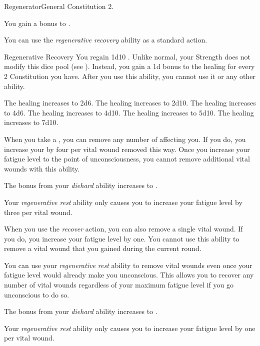     \begin{feat}{Regenerator}{General}
        \featpre Constitution 2.

         You gain a  bonus to .

         You can use the \textit{regenerative recovery} ability as a standard action.
        \begin{instantability}{Regenerative Recovery}
            \rankline
            You regain 1d10 \add {} .
            Unlike normal, your Strength does not modify this dice pool (see ).
            Instead, you gain a \plus1d bonus to the healing for every 2 Constitution you have.
            After you use this ability, you  cannot use it or any other  ability.

            \rankline
             The healing increases to 2d6.
             The healing increases to 2d10.
             The healing increases to 4d6.
             The healing increases to 4d10.
             The healing increases to 5d10.
             The healing increases to 7d10.
        \end{instantability}

         When you take a , you can remove any number of  affecting you.
        If you do, you increase your  by four per vital wound removed this way.
        Once you increase your fatigue level to the point of unconsciousness, you cannot remove additional vital wounds with this ability.

         The bonus from your \textit{diehard} ability increases to .

         Your \textit{regenerative rest} ability only causes you to increase your fatigue level by three per vital wound.

         When you use the \textit{recover} action, you can also remove a single vital wound.
        If you do, you increase your fatigue level by one.
        You cannot use this ability to remove a vital wound that you gained during the current round.

         You can use your \textit{regenerative rest} ability to remove vital wounds even once your fatigue level would already make you unconscious.
        This allows you to recover any number of vital wounds regardless of your maximum fatigue level if you go unconscious to do so.

         The bonus from your \textit{diehard} ability increases to .

         Your \textit{regenerative rest} ability only causes you to increase your fatigue level by one per vital wound.
    \end{feat}

